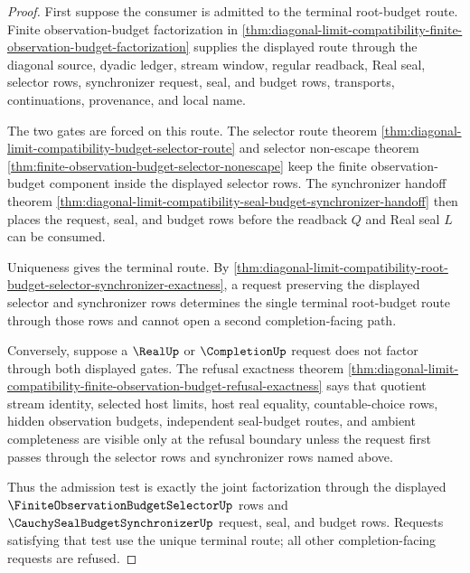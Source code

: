 \begin{proof}
First suppose the consumer is admitted to the terminal root-budget route. Finite observation-budget factorization in \autoref{thm:diagonal-limit-compatibility-finite-observation-budget-factorization} supplies the displayed route through the diagonal source, dyadic ledger, stream window, regular readback, Real seal, selector rows, synchronizer request, seal, and budget rows, transports, continuations, provenance, and local name.

The two gates are forced on this route. The selector route theorem \autoref{thm:diagonal-limit-compatibility-budget-selector-route} and selector non-escape theorem \autoref{thm:finite-observation-budget-selector-nonescape} keep the finite observation-budget component inside the displayed selector rows. The synchronizer handoff theorem \autoref{thm:diagonal-limit-compatibility-seal-budget-synchronizer-handoff} then places the request, seal, and budget rows before the readback $Q$ and Real seal $L$ can be consumed.

Uniqueness gives the terminal route. By \autoref{thm:diagonal-limit-compatibility-root-budget-selector-synchronizer-exactness}, a request preserving the displayed selector and synchronizer rows determines the single terminal root-budget route through those rows and cannot open a second completion-facing path.

Conversely, suppose a $\RealUp$ or $\CompletionUp$ request does not factor through both displayed gates. The refusal exactness theorem \autoref{thm:diagonal-limit-compatibility-finite-observation-budget-refusal-exactness} says that quotient stream identity, selected host limits, host real equality, countable-choice rows, hidden observation budgets, independent seal-budget routes, and ambient completeness are visible only at the refusal boundary unless the request first passes through the selector rows and synchronizer rows named above.

Thus the admission test is exactly the joint factorization through the displayed $\FiniteObservationBudgetSelectorUp$ rows and $\CauchySealBudgetSynchronizerUp$ request, seal, and budget rows. Requests satisfying that test use the unique terminal route; all other completion-facing requests are refused.
\end{proof}

